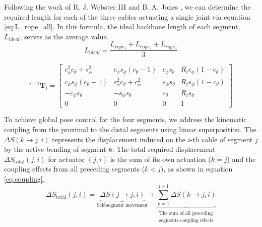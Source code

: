 \documentclass[conference]{IEEEtran}
\begin{document}
Following the work of R. J. Webster III and B. A. Jones \cite{b7}, we can determine the required length for each of the three cables actuating a single joint via equation \eqref{eq:L_rope_all}. In this formula, the ideal backbone length of each segment, $L_{ideal}$, serves as the average value.
\begin{equation}
    L_{ideal} = \frac{L_{rope_1} + L_{rope_2} + L_{rope_3}}{3}
    \label{eq:L_rope_all}
\end{equation}

\begin{figure}[b]
\begin{equation}
    ^{i-1}\mathbf{T}_i = 
    \begin{bmatrix}
        c_\phi^2 c_\theta + s_\phi^2 & c_\phi s_\phi (c_\theta - 1) & c_\phi s_\theta & R_i c_\phi (1 - c_\theta) \\
        c_\phi s_\phi (c_\theta - 1) & s_\phi^2 c_\theta + c_\phi^2 & s_\phi s_\theta & R_i s_\phi (1 - c_\theta) \\
        -c_\phi s_\theta & -s_\phi s_\theta & c_\theta & R_i s_\theta \\
        0 & 0 & 0 & 1
    \end{bmatrix}
    \label{eq:T_matrix}
    \tag{11}
\end{equation}
\end{figure}

To achieve global pose control for the four segments, we address the kinematic coupling from the proximal to the distal segments using linear superposition. The $\Delta S(k \to j, i)$ represents the displacement induced on the $i$-th cable of segment $j$ by the active bending of segment $k$. The total required displacement $\Delta S_{\text{total}}(j, i)$ for actuator $(j, i)$ is the sum of its own actuation ($k=j$) and the coupling effects from all preceding segments ($k<j$), as shown in equation \eqref{eq:coupling}.
\begin{equation}
    \Delta S_{\text{total}}(j, i) = \underbrace{\Delta S(j \to j, i)}_{\text{Self-segment movement}} + \underbrace{\sum_{k=1}^{j-1} \Delta S(k \to j, i)}_{\substack{\text{The sum of all preceding} \\ \text{segments coupling effects}}}
    \label{eq:coupling}
\end{equation}
\end{document}
